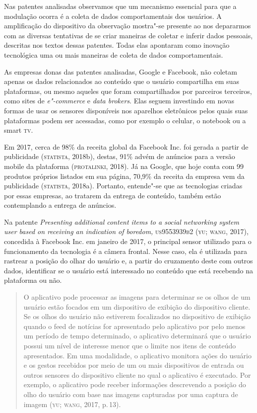 Nas patentes analisadas observamos que um mecanismo essencial para que a
modulação ocorra é a coleta de dados comportamentais dos usuários. A
amplificação do dispositivo da observação mostra"-se presente ao nos
depararmos com as diversas tentativas de se criar maneiras de coletar e
inferir dados pessoais, descritas nos textos dessas patentes. Todas elas
apontaram como inovação tecnológica uma ou mais maneiras de coleta de
dados comportamentais.

As empresas donas das patentes analisadas, Google e Facebook, não
coletam apenas os dados relacionados ao conteúdo que o usuário
compartilha em suas plataformas, ou mesmo aqueles que foram
compartilhados por parceiros terceiros, como sites de \textit{e"-commerce}
e \textit{data brokers}. Elas seguem investindo em novas formas de usar os
sensores disponíveis nos aparelhos eletrônicos pelos quais suas
plataformas podem ser acessadas, como por exemplo o celular, o notebook
ou a smart \textsc{tv}.

Em 2017, cerca de 98\% da receita global da Facebook Inc. foi gerada a
partir de publicidade (\textsc{statista}, 2018b), destas, 91\% advém de anúncios
para a versão mobile da plataforma (\textsc{protalinki}, 2018). Já na Google, que
hoje conta com 99 produtos próprios listados em sua página, 70,9\% da
receita da empresa vem da publicidade (\textsc{statista}, 2018a). Portanto,
entende"-se que as tecnologias criadas por essas empresas, ao tratarem da
entrega de conteúdo, também estão contemplando a entrega de anúncios.

Na patente \textit{Presenting additional content items to a social
networking system user based on receiving an indication of boredom,}
\textsc{us9553939b2} (\textsc{yu; wang}, 2017), concedida à Facebook Inc. em janeiro de
2017, o principal sensor utilizado para o funcionamento da tecnologia é
a câmera frontal. Nesse caso, ela é utilizada para rastrear a posição do
olhar do usuário e, a partir do cruzamento deste com outros dados,
identificar se o usuário está interessado no conteúdo que está recebendo
na plataforma ou não.

\begin{quote}
O aplicativo pode processar as imagens para determinar se os olhos de um
usuário estão focados em um dispositivo de exibição do dispositivo
cliente. Se os olhos do usuário não estiverem focalizados no dispositivo
de exibição quando o feed de notícias for apresentado pelo aplicativo
por pelo menos um período de tempo determinado, o aplicativo determinará
que o usuário possui um nível de interesse menor que o limite nos itens
de conteúdo apresentados. Em uma modalidade, o aplicativo monitora ações
do usuário e os gestos recebidos por meio de um ou mais dispositivos de
entrada ou outros sensores do dispositivo cliente no qual o aplicativo é
executado. Por exemplo, o aplicativo pode receber informações
descrevendo a posição do olho do usuário com base nas imagens capturadas
por uma captura de imagem (\textsc{yu; wang}, 2017, p.\,13).
\end{quote}

